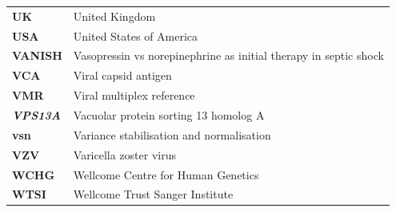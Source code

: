 \begin{longtable}[l]{l l}
		\textbf{UK} & United Kingdom\\
		\textbf{USA} & United States of America\\
		\textbf{VANISH} & Vasopressin vs norepinephrine as initial therapy in septic shock\\
		\textbf{VCA} & Viral capsid antigen\\
		\textbf{VMR} & Viral multiplex reference\\
		\textit{\textbf{VPS13A}} & Vacuolar protein sorting 13 homolog A\\
		\textbf{vsn} & Variance stabilisation and normalisation\\
		\textbf{VZV} & Varicella zoster virus\\
		\textbf{WCHG} & Wellcome Centre for Human Genetics\\
		\textbf{WTSI} & Wellcome Trust Sanger Institute\\
		
		
		

\end{longtable}